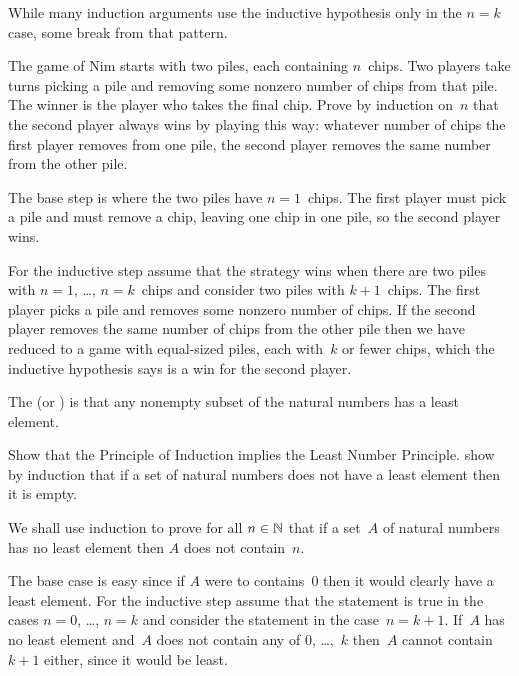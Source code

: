 \documentclass{ibl}  %
\begin{document}
While many induction arguments use the inductive 
hypothesis only in the $n=k$ case,
some break from that pattern.

\begin{problem}
The game of Nim starts with two piles, each containing $n$~chips.
Two players take turns picking a pile and removing 
some nonzero number of chips from that pile. 
The winner is the player who takes the final chip.
Prove by induction on~$n$ that the second player always wins by
playing this way: whatever number of chips the first player removes
from one pile, the second player removes the same number from the other pile.
\begin{answer}
The base step is where the two piles have $n=1$~chips.
The first player must pick a pile and must remove a chip, leaving one chip
in one pile, so the second player wins.

For the inductive step assume that the strategy wins when there are two piles
with $n=1$, \ldots, $n=k$~chips and consider two piles with
$k+1$~chips.
The first player picks a pile and removes some nonzero number of chips.
If the second player removes the same number of chips from the other
pile then we have reduced to a game with equal-sized piles, each
with~$k$ or fewer chips, which the inductive hypothesis says
is a win for the second player.  
\end{answer}
\end{problem}

\begin{df}
The  
(or )
is that any nonempty 
subset of the natural
numbers has a least element.  
\end{df}

\begin{problem}
Show that the Principle of Induction implies the Least Number 
Principle.
\hint
show by induction that if a set of natural numbers does not
have a least element then it is empty.
\begin{answer}
We shall use induction to prove for all $n\in\mathbb{N}$ that if a set~$A$ 
of natural numbers has no
least element then $A$ does not contain~$n$.

The base case is easy since if $A$ were to contains~$0$ then it would
clearly have a least element.
For the inductive step assume that the statement is true in the cases
$n=0$, \ldots, $n=k$ and consider the statement in the case~$n=k+1$.
If~$A$ has no least element and~$A$ does not contain any of $0$, \ldots,~$k$ 
then~$A$ cannot contain~$k+1$ either, since it would be least.   
\end{answer}
\end{problem}
\end{document}

